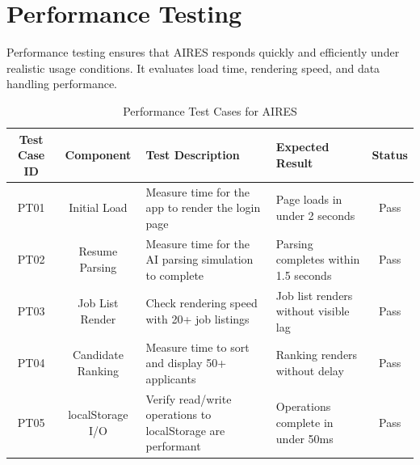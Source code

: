 \section{Performance Testing}
Performance testing ensures that AIRES responds quickly and efficiently under realistic usage conditions. It evaluates load time, rendering speed, and data handling performance.
\begin{table}[H]
    \centering
    \renewcommand{\arraystretch}{1.3}
    \begin{tabular}{|c|c|p{4cm}|p{3cm}|c|}
        \hline
        \textbf{Test Case ID} & \textbf{Component} & \textbf{Test Description} & \textbf{Expected Result} & \textbf{Status} \\
        \hline
        PT01 & Initial Load & Measure time for the app to render the login page & Page loads in under 2 seconds & Pass \\
        \hline
        PT02 & Resume Parsing & Measure time for the AI parsing simulation to complete & Parsing completes within 1.5 seconds & Pass \\
        \hline
        PT03 & Job List Render & Check rendering speed with 20+ job listings & Job list renders without visible lag & Pass \\
        \hline
        PT04 & Candidate Ranking & Measure time to sort and display 50+ applicants & Ranking renders without delay & Pass \\
        \hline
        PT05 & localStorage I/O & Verify read/write operations to localStorage are performant & Operations complete in under 50ms & Pass \\
        \hline
    \end{tabular}
    \caption{Performance Test Cases for AIRES}
    \label{tab:performance_tests}
\end{table}


